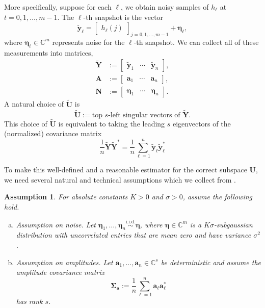 \documentclass[11pt]{article}
\newtheorem{assumption}[theorem]{Assumption}
\theoremstyle{definition}
\numberwithin{theorem}{section}
\numberwithin{equation}{section}
\def\C{\mathbb{C}}
\renewcommand{\tilde}{\widetilde}
\newcommand{\bfa}{{\boldsymbol a}}
\newcommand{\bfy}{{\boldsymbol y}}
\newcommand{\bfA}{{\boldsymbol A}}
\newcommand{\bfN}{{\boldsymbol N}}
\newcommand{\bfU}{{\boldsymbol U}}
\newcommand{\bfY}{{\boldsymbol Y}}
\newcommand{\bfeta}{{\boldsymbol \eta}}
\newcommand{\bfSigma}{{\boldsymbol \Sigma}}
\numberwithin{equation}{section}
\begin{document}
More specifically, suppose for each $\ell$, we obtain noisy samples of $h_\ell$ at $t=0,1,\dots,m-1$. The $\ell$-th snapshot is the vector 
$$
\tilde \bfy_\ell = \begin{bmatrix} h_\ell(j) \end{bmatrix}_{j=0,1,\dots,m-1} + \bfeta_\ell,
$$
where $\bfeta_\ell\in \C^m$ represents noise for the $\ell$-th snapshot. We can collect all of these measurements into matrices,
\begin{align*}
    \tilde\bfY
&:=\begin{bmatrix}
    \tilde \bfy_1 &\cdots &\tilde \bfy_n
\end{bmatrix}, \\
\bfA&:= \begin{bmatrix}
        \bfa_1 &\cdots &\bfa_n
\end{bmatrix}, \\
\bfN &:=
\begin{bmatrix}
    \bfeta_1 &\cdots &\bfeta_n
\end{bmatrix}. 
\end{align*}
A natural choice of $\tilde\bfU$ is
\begin{equation}
    \label{eq:defUtilde2}
    \tilde \bfU:= \text{top $s$-left singular vectors of }\tilde \bfY.
\end{equation}
This choice of $\tilde\bfU$ is equivalent to taking the leading $s$ eigenvectors of the (normalized) covariance matrix
$$
\frac 1 n \tilde \bfY \tilde \bfY^* 
=\frac 1 n \sum_{\ell=1}^n \tilde \bfy_\ell \tilde \bfy_\ell^*
$$

To make this well-defined and a reasonable estimator for the correct subspace $\bfU$, we need several natural and technical assumptions which we collect from \cite[Assumption 3]{dirksen2025subspace}. 

\begin{assumption}
    \label{assump:specestimationproblem}
    For absolute constants $K>0$ and $\sigma>0$, assume the following hold. 
    \quad 
    \begin{enumerate}[(a)]
        \item 
        Assumption on noise. Let $\bfeta_1,\dots,\bfeta_n\overset{\text{i.i.d.}}{\sim} \bfeta$, where $\bfeta\in\C^m$ is a $K \sigma$-subgaussian distribution with uncorrelated entries that are mean zero and have variance $\sigma^2$. 
        \item 
        Assumption on amplitudes. Let $\bfa_1,\dots,\bfa_n\in \C^s$ be deterministic and assume the amplitude covariance matrix
        \begin{equation}
                \label{eq:ampcovariance}
                \bfSigma_{\bfa} :=\frac 1 n \sum_{\ell=1}^n \bfa_\ell \bfa_\ell^*
        \end{equation}
        has rank $s$. 
    \end{enumerate}
\end{assumption}
\end{document}
